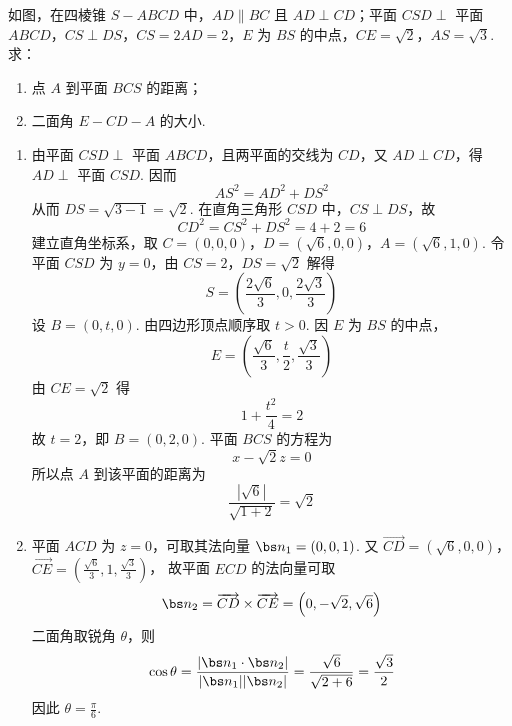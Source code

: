 \begin{problem}
如图，在四棱锥 \(S - ABCD\) 中，\(AD \parallel BC\) 且 \(AD \perp CD\)；平面 \(CSD \perp\) 平面 \(ABCD\)，\(CS \perp DS\)，\(CS = 2AD = 2\)，\(E\) 为 \(BS\) 的中点，\(CE = \sqrt{2}\)，\(AS = \sqrt{3}\). 求：

\begin{enumerate}
\item 点 \(A\) 到平面 \(BCS\) 的距离；
\item 二面角 \(E - CD - A\) 的大小.
\end{enumerate}


\begin{solution}
\begin{enumerate}
\item 由平面 \(CSD\perp\) 平面 \(ABCD\)，且两平面的交线为 \(CD\)，又 \(AD\perp CD\)，得 \(AD\perp\) 平面 \(CSD\). 因而
\[
AS^{2}=AD^{2}+DS^{2}
\]
从而 \(DS=\sqrt{3-1}=\sqrt2\). 在直角三角形 \(CSD\) 中，\(CS\perp DS\)，故
\[
CD^{2}=CS^{2}+DS^{2}=4+2=6
\]
建立直角坐标系，取
\(C=(0,0,0)\)，\(D=(\sqrt6,0,0)\)，\(A=(\sqrt6,1,0)\).
令平面 \(CSD\) 为 \(y=0\)，由 \(CS=2\)，\(DS=\sqrt2\) 解得
\[
S=\left(\frac{2\sqrt6}{3},0,\frac{2\sqrt3}{3}\right)
\]
设 \(B=(0,t,0)\). 由四边形顶点顺序取 \(t>0\). 因 \(E\) 为 \(BS\) 的中点，
\[
E=\left(\frac{\sqrt6}{3},\frac t2,\frac{\sqrt3}{3}\right)
\]
由 \(CE=\sqrt2\) 得
\[
1+\frac{t^2}{4}=2
\]
故 \(t=2\)，即 \(B=(0,2,0)\). 平面 \(BCS\) 的方程为
\[
x-\sqrt2z=0
\]
所以点 \(A\) 到该平面的距离为
\[
\frac{|\sqrt6|}{\sqrt{1+2}}=\sqrt2
\]
\item 平面 \(ACD\) 为 \(z=0\)，可取其法向量 \(\bs n_1=(0,0,1)\). 又
\(\overrightarrow{CD}=(\sqrt6,0,0)\)，\(\overrightarrow{CE}=\left(\frac{\sqrt6}{3},1,\frac{\sqrt3}{3}\right)\)，
故平面 \(ECD\) 的法向量可取
\[
\bs n_2=\overrightarrow{CD}\times\overrightarrow{CE}
=\left(0,-\sqrt2,\sqrt6\right)
\]
二面角取锐角 \(\theta\)，则
\[
\cos\theta=\frac{|\bs n_1\cdot\bs n_2|}{|\bs n_1||\bs n_2|}
=\frac{\sqrt6}{\sqrt{2+6}}=\frac{\sqrt3}{2}
\]
因此 \(\theta=\frac{\pi}{6}\).
\end{enumerate}
\end{solution}
\end{problem}

